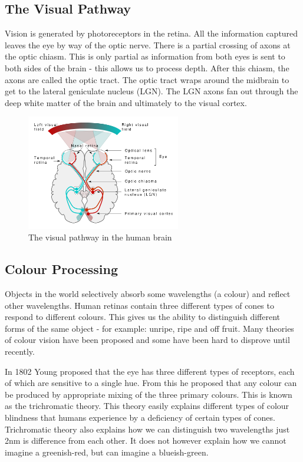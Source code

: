 \documentclass{article}
\begin{document}
	\subsection{The Visual Pathway}
	Vision is generated by photoreceptors in the retina. All the information captured leaves the eye by way of the optic nerve. There is a partial crossing of axons at the optic chiasm. This is only partial as information from both eyes is sent to both sides of the brain - this allows us to process depth. After this chiasm, the axons are called the optic tract. The optic tract wraps around the midbrain to get to the lateral geniculate nucleus (LGN). The LGN axons fan out through the deep white matter of the brain and ultimately to the visual cortex.
	\begin{figure}[h]
		\centering
		\includegraphics[width=0.6\textwidth]{visual_pathway}
		\caption{The visual pathway in the human brain}
		\label{fig:visual pathway}
	\end{figure}
	
	\subsection{Colour Processing}
	Objects in the world selectively absorb some wavelengths (a colour) and reflect other wavelengths. Human retinas contain three different types of cones to respond to different colours. This gives us the ability to distinguish different forms of the same object - for example: unripe, ripe and off fruit. Many theories of colour vision have been proposed and some have been hard to disprove until recently. 
	\par	
	In 1802 Young proposed that the eye has three different types of receptors, each of which are sensitive to a single hue. From this he proposed that any colour can be produced by appropriate mixing of the three primary colours. This is known as the trichromatic theory. This theory easily explains different types of colour blindness that humans experience by a deficiency of certain types of cones. Trichromatic theory also explains how we can distinguish two wavelengths just 2nm is difference from each other. It does not however explain how we cannot imagine a greenish-red, but can imagine a blueish-green.
	
\end{document}
